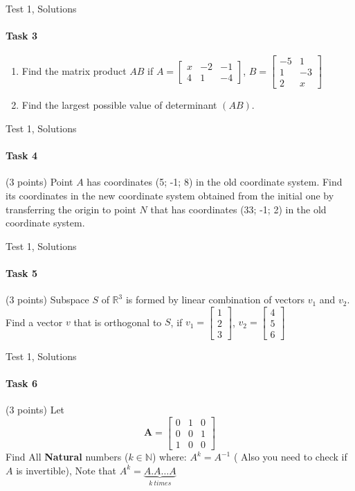\documentclass[aspectratio=169]{beamer}
\begin{document}
\begin{frame}[t]{Test 1, Solutions}
    \framesubtitle{Task 3}
    \begin{enumerate}
        \item Find the matrix product $AB$ if $A=\begin{bmatrix}x & -2 & -1 \\ 4 & 1 & -4 \end{bmatrix}$, $B=\begin{bmatrix} -5 & 1 \\ 1 & -3 \\ 2 & x \end{bmatrix}$
        \item Find the largest possible value of determinant $(AB)$.
    \end{enumerate}
    \end{frame}

\begin{frame}[t]{Test 1, Solutions}
\framesubtitle{Task 4}
(3 points)  Point $A$ has coordinates (5; -1; 8) in the old coordinate system. Find its coordinates in the new coordinate system obtained from the initial one by transferring the origin to point $N$ that has coordinates (33; -1; 2) in the old coordinate system.
\end{frame}


\begin{frame}[t]{Test 1, Solutions}
    \framesubtitle{Task 5}
    (3 points) Subspace $S$ of $\mathbb{R}^3$ is formed by linear combination of vectors $v_1$ and $v_2$. Find a vector $v$ that is orthogonal to $S$, if $v_1 = \begin{bmatrix}1 \\ 2\\ 3\end{bmatrix}$, $v_2 = \begin{bmatrix}4 \\ 5\\ 6\end{bmatrix}$
\end{frame}


\begin{frame}[t]{Test 1, Solutions}
    \framesubtitle{Task 6}
    (3 points) Let \begin{equation}
        \mathbf{A}=\begin{bmatrix}
           0  & 1 & 0 \\
           0  & 0 & 1 \\
           1  & 0 & 0 
        \end{bmatrix}
        \end{equation}
    Find All \textbf{Natural} numbers ($k\in \mathbb{N}$) where: $A^k=A^{-1}$ ( Also you need to check if $A$ is invertible), Note that $A^k=\underbrace{A.A \dots A}_{k \ times} $
\end{frame}
\end{document}
